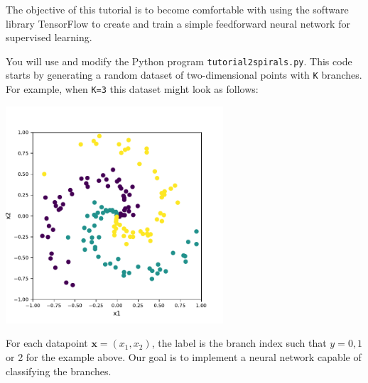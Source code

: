 \documentclass[letterpaper]{scrartcl}
\begin{document}

\vspace{-3cm}


\date{May 28, 2019}

\maketitle

The objective of this tutorial is to become comfortable with using the software library TensorFlow to 
create and train a simple feedforward neural network for supervised learning.

You will use and modify the Python program \texttt{tutorial2{\textunderscore}spirals.py}.
This code starts by generating a random dataset of two-dimensional points with \texttt{K} branches.
For example, when \texttt{K=3} this dataset might look as follows:
\vspace{-3mm}
\begin{center}
\includegraphics[width=8.1cm]{spiral_data.pdf}
\end{center}
For each datapoint $\mathbf{x} = (x_1, x_2)$, the label is the branch index such that $y = 0, 1$ or 2 for the example above.
Our goal is to implement a neural network capable of classifying the branches.
\end{document}
